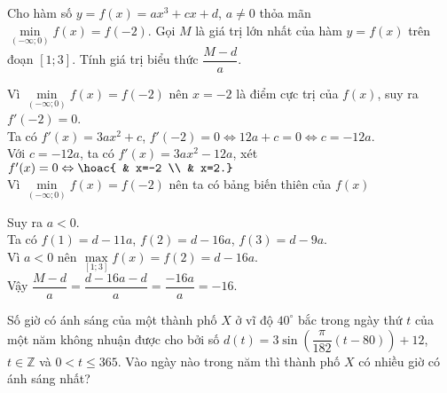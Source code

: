 \begin{ex}%
    Cho hàm số $y=f(x)=ax^3+cx+d$, $a\neq0$ thỏa mãn $\min\limits_{(-\infty;0)} f(x)=f(-2)$. Gọi $M$ là giá trị lớn nhất của hàm $y=f(x)$ trên đoạn $[1;3]$. Tính giá trị biểu thức $\dfrac{M-d}{a}$.
    \loigiai
    {
        Vì $\min\limits_{(-\infty;0)} f(x)=f(-2)$ nên $x=-2$ là điểm cực trị của $f(x)$, suy ra $f'(-2)=0$. \\
        Ta có $f'(x)=3ax^2+c$, $f'(-2)=0 \Leftrightarrow 12a+c=0 \Leftrightarrow c=-12a$. \\
        Với $c=-12a$, ta có $f'(x)=3ax^2-12a$, xét $f'(x)=0 \Leftrightarrow \hoac{ & x=-2 \\ & x=2.}$ \\
        Vì $\min\limits_{(-\infty;0)} f(x)=f(-2)$ nên ta có bảng biến thiên của $f(x)$
        \begin{center}
        \end{center}
        Suy ra $a<0$. \\
        Ta có $f(1)=d-11a$, $f(2)=d-16a$, $f(3)=d-9a$. \\
        Vì $a<0$ nên $\max\limits_{[1;3]} f(x)=f(2)=d-16a$. \\
        Vậy $\dfrac{M-d}{a}=\dfrac{d-16a-d}{a}=\dfrac{-16a}{a}=-16$.
    }
\end{ex}
\begin{ex}%
    Số giờ có ánh sáng của một thành phố $X$ ở vĩ độ $40^\circ$ bắc trong ngày thứ $t$ của một năm không nhuận được cho bởi số $d(t)=3\sin\left(\dfrac{\pi}{182}(t-80)\right)+12$, $t\in\mathbb{Z}$ và $0<t\leq 365$. Vào ngày nào trong năm thì thành phố $X$ có nhiều giờ có ánh sáng nhất?
\end{ex}
